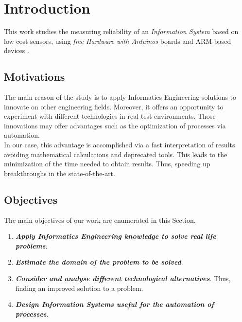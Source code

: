 
\chapter{Introduction}
\newpage


This work studies the measuring reliability of an \textit{Information System} based on low cost sensors, using \textit{free Hardware with Arduinos} \cite{noauthor_arduino_nodate-1, jjtorres_hardware_2014} boards and ARM-based devices \cite{ltd_leadership_nodate, ltd_-profile_nodate}.\\

\section{Motivations}

The main reason of the study is to apply Informatics Engineering solutions to innovate on other engineering fields. Moreover, it offers an opportunity to experiment with different technologies in real test environments. Those innovations may offer advantages such as the optimization of processes via automation. \\ 

In our case, this advantage is accomplished via a fast interpretation of results avoiding mathematical calculations and deprecated tools. This leads to the minimization of the time needed to obtain results. Thus, speeding up breakthroughs in the state-of-the-art. \\

\section{Objectives}

The main objectives of our work are enumerated in this Section.

\begin{enumerate}

\item \textbf{\textit{Apply Informatics Engineering knowledge to solve real life problems}}.

\item \textbf{\textit{Estimate the domain of the problem to be solved}}. 

\item \textbf{\textit{Consider and analyse different technological alternatives}}. Thus, finding an improved solution to a problem. 

\item \textbf{\textit{Design Information Systems useful for the automation of processes}}.

\end{enumerate}

